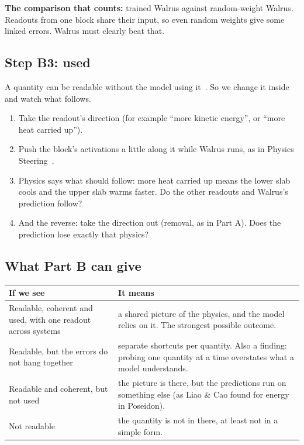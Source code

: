 \documentclass[11pt,a4paper]{article}
\begin{document}
\textbf{The comparison that counts:} trained Walrus against random-weight Walrus. Readouts from one block share their input,
so even random weights give some linked errors. Walrus must clearly beat that.

\subsection*{Step B3: used}

A quantity can be readable without the model using it~\cite{liao2026}. So we change it inside and watch what follows.
\begin{enumerate}[itemsep=0.5em]
  \item Take the readout's direction (for example ``more kinetic energy'', or ``more heat carried up'').
  \item Push the block's activations a little along it while Walrus runs, as in Physics Steering~\cite{fear2025}.
  \item Physics says what should follow: more heat carried up means the lower slab cools and the upper slab warms faster.
  Do the other readouts and Walrus's prediction follow?
  \item And the reverse: take the direction out (removal, as in Part A). Does the prediction lose exactly that physics?
\end{enumerate}

\subsection*{What Part B can give}

\begin{table}[H]
\centering
\renewcommand{\arraystretch}{1.55}
\small
\begin{tabularx}{\textwidth}{>{\raggedright\arraybackslash}p{4.6cm} >{\raggedright\arraybackslash}X}
\toprule
\textbf{If we see} & \textbf{It means} \\
\midrule
Readable, coherent and used, with one readout across systems & a shared picture of the physics, and the model relies on it. The strongest possible outcome. \\
Readable, but the errors do not hang together & separate shortcuts per quantity. Also a finding: probing one quantity at a time overstates what a model understands. \\
Readable and coherent, but not used & the picture is there, but the predictions run on something else (as Liao \& Cao found for energy in Poseidon). \\
Not readable & the quantity is not in there, at least not in a simple form. \\
\bottomrule
\end{tabularx}
\end{table}
\end{document}
